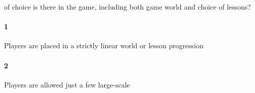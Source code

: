  of choice is there in the game, including both game world and choice of lessons?\paragraph{1}Players are placed in a strictly linear world or lesson progression\paragraph{2}Players are allowed just a few large-scale